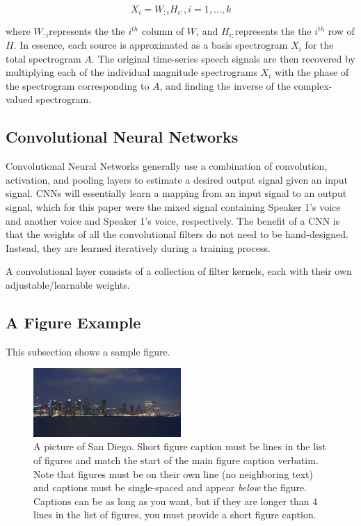 \documentclass[12pt,chapterheads]{ucsd}
\begin{document}
\begin{equation}
X_i = W_{:i}H_{i:}, i=1,...,k
\end{equation}

where $W_{:i} $represents the the $i^{th}$ column of $W$, and $H_{i:} $represents the the $i^{th}$ row of $H$. In essence, each source is approximated as a basis spectrogram $X_i$ for the total spectrogram $A$. The original time-series speech signals are then recovered by multiplying each of the individual magnitude spectrograms $X_i$ with the phase of the spectrogram corresponding to $A$, and finding the inverse of the complex-valued spectrogram.

\subsection{Convolutional Neural Networks}
Convolutional Neural Networks generally use a combination of convolution, activation, and pooling layers to estimate a desired output signal given an input signal. CNNs will essentially learn a mapping from an input signal to an output signal, which for this paper were the mixed signal containing Speaker 1's voice and another voice and Speaker 1's voice, respectively. The benefit of a CNN is that the weights of all the convolutional filters do not need to be hand-designed. Instead, they are learned iteratively during a training process.

A convolutional layer consists of a collection of filter kernels, each with their own adjustable/learnable weights. 

\subsection{A Figure Example}
\label{ssec:figure_example}

This subsection shows a sample figure.

\begin{figure}[h] 
  \centering
  \includegraphics[width=0.5\textwidth]{sandiego}
  \caption[A picture of San Diego. Short figure caption must be  lines in the list of figures]
{A picture of San Diego.  Short figure caption must be  lines in the list of figures and match the start of the main figure caption verbatim. Note that figures must be on their own line (no neighboring text) and captions must be single-spaced and appear \protect\textit{below} the figure.  Captions can be as long as you want, but if they are longer than 4 lines in the list of figures, you must provide a short figure caption.}
  \label{fig:sandiego}
\end{figure}
\end{document}
